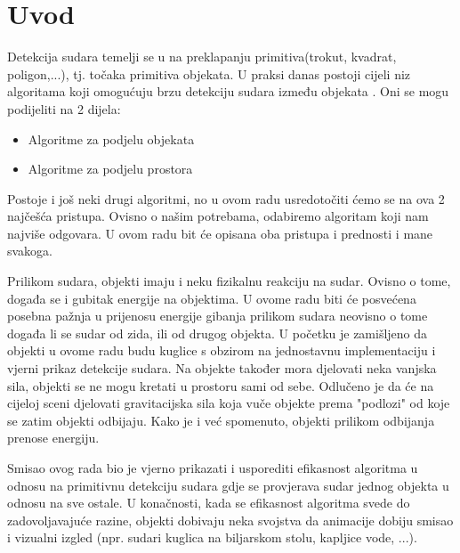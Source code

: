 \chapter{Uvod}

Detekcija sudara temelji se u na preklapanju primitiva(trokut, kvadrat, poligon,...)\cite{1}, tj. točaka primitiva objekata. U praksi danas postoji cijeli niz algoritama koji omogućuju brzu detekciju sudara između objekata \cite{1}. Oni se mogu podijeliti na 2 dijela:
\begin{itemize}
	\item Algoritme za podjelu objekata
	\item Algoritme za podjelu prostora
\end{itemize}
Postoje i još neki drugi algoritmi, no u ovom radu usredotočiti ćemo se na ova 2 najčešća pristupa. Ovisno o našim potrebama, odabiremo algoritam koji nam najviše odgovara. U ovom radu bit će opisana oba pristupa i prednosti i mane svakoga.

Prilikom sudara, objekti imaju i neku fizikalnu reakciju na sudar. Ovisno o tome, događa se i gubitak energije na objektima. U ovome radu biti će posvećena posebna pažnja u prijenosu energije gibanja prilikom sudara neovisno o tome događa li se sudar od zida, ili od drugog objekta. U početku je zamišljeno da objekti u ovome radu budu kuglice s obzirom na jednostavnu implementaciju i vjerni prikaz detekcije sudara. Na objekte također mora djelovati neka vanjska sila, objekti se ne mogu kretati u prostoru sami od sebe. Odlučeno je da će na cijeloj sceni djelovati gravitacijska sila koja vuče objekte prema "podlozi" od koje se zatim objekti odbijaju. Kako je i već spomenuto, objekti prilikom odbijanja prenose energiju.

Smisao ovog rada bio je vjerno prikazati i usporediti efikasnost algoritma u odnosu na primitivnu detekciju sudara gdje se provjerava sudar jednog objekta u odnosu na sve ostale. U konačnosti, kada se efikasnost algoritma svede do zadovoljavajuće razine, objekti dobivaju neka svojstva da animacije dobiju smisao i vizualni izgled (npr. sudari kuglica na biljarskom stolu, kapljice vode, ...).


